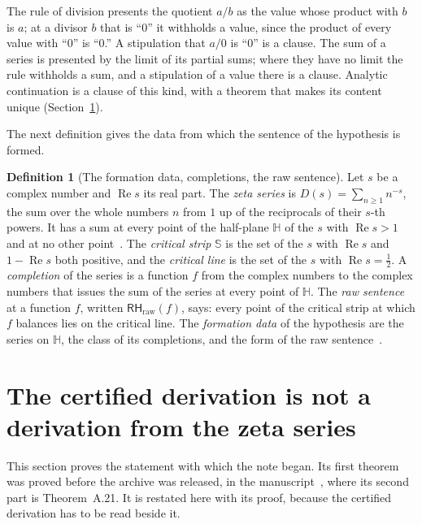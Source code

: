 \documentclass[11pt]{article}
\theoremstyle{definition}
\newtheorem{definition}[theorem]{Definition}
\theoremstyle{remark}
\newcommand{\re}{\operatorname{Re}}
\newcommand{\RHraw}{\mathsf{RH}_{\mathrm{raw}}}
\newcommand{\Hp}{\mathbb H}
\newcommand{\St}{\mathbb S}
\begin{document}
\noindent The rule of division presents the quotient $a/b$ as the value whose product with $b$ is $a$; at a divisor $b$ that is ``0'' it withholds a value, since the product of every value with ``0'' is ``0.'' A stipulation that $a/0$ is ``0'' is a clause. The sum of a series is presented by the limit of its partial sums; where they have no limit the rule withholds a sum, and a stipulation of a value there is a clause. Analytic continuation is a clause of this kind, with a theorem that makes its content unique (Section~\ref{sec:between}).

\noindent The next definition gives the data from which the sentence of the hypothesis is formed.

\begin{definition}[The formation data, completions, the raw sentence]\label{def:formation}
Let $s$ be a complex number and $\re s$ its real part. The \emph{zeta series} is $D(s)=\sum_{n\ge1}n^{-s}$, the sum over the whole numbers $n$ from $1$ up of the reciprocals of their $s$-th powers. It has a sum at every point of the half-plane $\Hp$ of the $s$ with $\re s>1$ and at no other point~\citep[ch.~II]{hardyriesz}. The \emph{critical strip} $\St$ is the set of the $s$ with $\re s$ and $1-\re s$ both positive, and the \emph{critical line} is the set of the $s$ with $\re s=\tfrac12$. A \emph{completion} of the series is a function $f$ from the complex numbers to the complex numbers that issues the sum of the series at every point of $\Hp$. The \emph{raw sentence} at a function $f$, written $\RHraw(f)$, says: every point of the critical strip at which $f$ balances lies on the critical line. The \emph{formation data} of the hypothesis are the series on $\Hp$, the class of its completions, and the form of the raw sentence~\citep{tv}.
\end{definition}

\section{The certified derivation is not a derivation from the zeta series}\label{sec:between}

This section proves the statement with which the note began. Its first theorem was proved before the archive was released, in the manuscript~\citep{tv}, where its second part is Theorem~A.21. It is restated here with its proof, because the certified derivation has to be read beside it.
\end{document}
